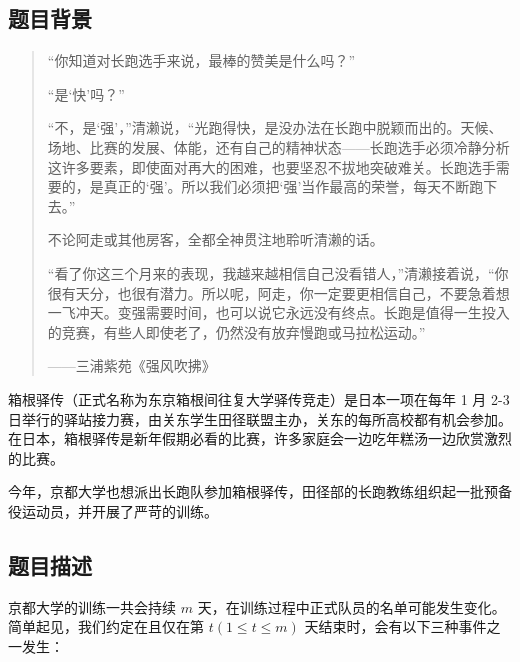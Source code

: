 \subsection*{题目背景}

\begin{quotation}
    “你知道对长跑选手来说，最棒的赞美是什么吗？”

    “是‘快’吗？”

    “不，是‘强’，”清濑说，“光跑得快，是没办法在长跑中脱颖而出的。天候、场地、比赛的发展、体能，还有自己的精神状态——长跑选手必须冷静分析这许多要素，即使面对再大的困难，也要坚忍不拔地突破难关。长跑选手需要的，是真正的‘强’。所以我们必须把‘强’当作最高的荣誉，每天不断跑下去。”

    不论阿走或其他房客，全都全神贯注地聆听清濑的话。

    “看了你这三个月来的表现，我越来越相信自己没看错人，”清濑接着说，“你很有天分，也很有潜力。所以呢，阿走，你一定要更相信自己，不要急着想一飞冲天。变强需要时间，也可以说它永远没有终点。长跑是值得一生投入的竞赛，有些人即使老了，仍然没有放弃慢跑或马拉松运动。”

    ——三浦紫苑《强风吹拂》

\end{quotation}

箱根驿传（正式名称为东京箱根间往复大学驿传竞走）是日本一项在每年 1 月 2-3 日举行的驿站接力赛，由关东学生田径联盟主办，关东的每所高校都有机会参加。
在日本，箱根驿传是新年假期必看的比赛，许多家庭会一边吃年糕汤一边欣赏激烈的比赛。

今年，京都大学也想派出长跑队参加箱根驿传，田径部的长跑教练组织起一批预备役运动员，并开展了严苛的训练。

\subsection*{题目描述}

京都大学的训练一共会持续 $m$ 天，在训练过程中正式队员的名单可能发生变化。
简单起见，我们约定在且仅在第 $t (1 \le t \le m)$ 天结束时，会有以下三种事件之一发生：

